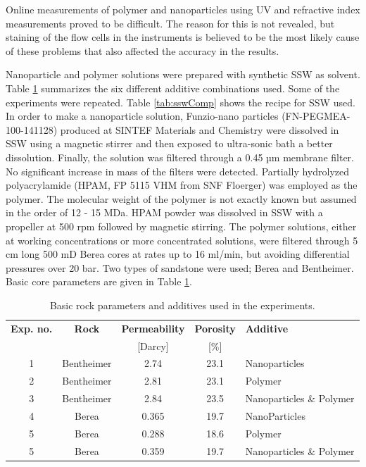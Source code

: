 Online measurements of polymer and nanoparticles using UV and refractive index measurements proved to be difficult. The reason for this is not revealed, but staining of the flow cells in the instruments is believed to be the most likely cause of these problems that also affected the accuracy in the results.

Nanoparticle and polymer solutions were prepared with synthetic SSW as solvent. Table \ref{tab:rockParams} summarizes the six different additive combinations used. Some of the experiments were repeated. Table \ref{tab:sswComp} shows the recipe for SSW used. In order to make a nanoparticle solution, Funzio-nano particles (FN-PEGMEA-100-141128) produced at SINTEF Materials and Chemistry were dissolved in SSW using a magnetic stirrer and then exposed to ultra-sonic bath a better dissolution. Finally, the solution was filtered through a 0.45 µm membrane filter. No significant increase in mass of the filters were detected. Partially hydrolyzed polyacrylamide (HPAM, FP 5115 VHM from SNF Floerger) was employed as the polymer. The molecular weight of the polymer is not exactly known but assumed in the order of 12 - 15 MDa. HPAM powder was dissolved in SSW with a propeller at 500 rpm followed by magnetic stirring. The polymer solutions, either at working concentrations or more concentrated solutions, were filtered through 5 cm long 500 mD Berea cores at rates up to 16 ml/min, but avoiding differential pressures over 20 bar. Two types of sandstone were used; Berea and Bentheimer. Basic core parameters are given in Table \ref{tab:rockParams}.

\begin{table} 
\small
\centering
\caption{Basic rock parameters and additives used in the experiments.}
\label{tab:rockParams}
\begin{tabular}{c c c c l } 
\toprule
\textbf{Exp. no.} & \textbf{Rock} & \textbf{Permeability} & \textbf{Porosity} & \textbf{Additive} \\ 
&& [Darcy] & [\%] & \\
\midrule 
1   & Bentheimer    & 2.74 & 23.1 & Nanoparticles\\
2   & Bentheimer    & 2.81 & 23.1 & Polymer \\ 
3   & Bentheimer    & 2.84 & 23.5 & Nanoparticles \& Polymer \\ 
4   & Berea      & 0.365 & 19.7 & NanoParticles\\
5   & Berea      & 0.288 & 18.6 & Polymer \\ 
5   & Berea      & 0.359 & 19.7 & Nanoparticles \& Polymer \\ 
\bottomrule
\end{tabular}
\end{table}


